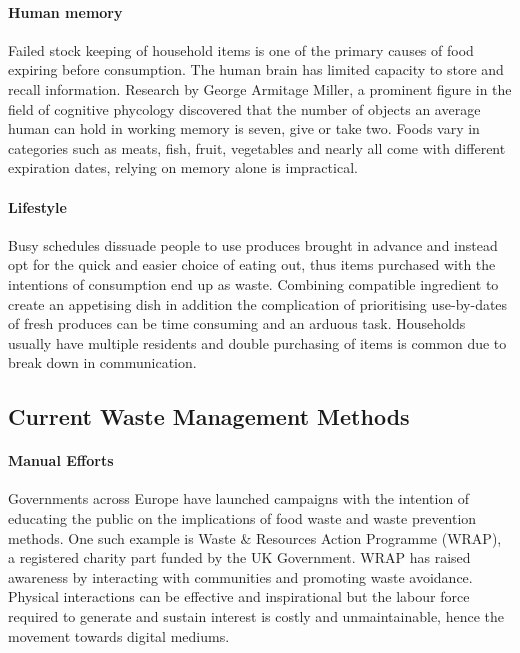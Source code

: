 \documentclass[a4paper, 11pt]{article}
\begin{document}
\paragraph{Human memory}Failed stock keeping of household items is one of the primary causes of food expiring before consumption. The human brain has limited capacity to store and recall information. Research by George Armitage Miller, a prominent figure in the field of cognitive phycology discovered that the number of objects an average human can hold in working memory is seven, give or take two.\cite{memory} Foods vary in categories such as meats, fish, fruit, vegetables and nearly all come with different expiration dates, relying on memory alone is impractical. 

\paragraph{Lifestyle} Busy schedules dissuade people to use produces brought in advance and instead opt for the quick and easier choice of eating out, thus items purchased with the intentions of consumption end up as waste.\cite{motivation} Combining compatible ingredient to create an appetising dish in addition the complication of prioritising use-by-dates of fresh produces can be time consuming and an arduous task. Households usually have multiple residents and double purchasing of items is common due to break down in communication.

\vspace{\baselineskip}
\vspace{\baselineskip}
\vspace{\baselineskip}

\subsection{Current Waste Management Methods}

\paragraph{Manual Efforts}
Governments across Europe have launched campaigns with the intention of educating the public on the implications of food waste and waste prevention methods. One such example is Waste \& Resources Action Programme (WRAP), a registered charity part funded by the UK Government. WRAP has raised awareness by interacting with communities and promoting waste avoidance. Physical interactions can be effective and inspirational but the labour force required to generate and sustain interest is costly and unmaintainable, hence the movement towards digital mediums.\cite{FoodWaste}
\end{document}
